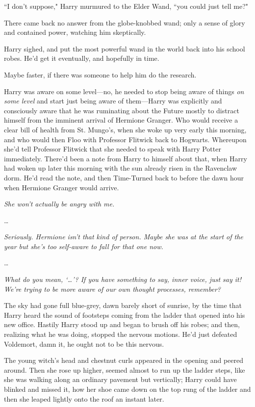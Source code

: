 ``I don't suppose," Harry murmured to the Elder Wand, ``you could just tell me?"

There came back no answer from the globe-knobbed wand; only a sense of glory and contained power, watching him skeptically.

Harry sighed, and put the most powerful wand in the world back into his school robes. He'd get it eventually, and hopefully in time.

Maybe faster, if there was someone to help him do the research.

Harry was aware on some level---no, he needed to stop being aware of things \emph{on some level} and start just being aware of them---Harry was explicitly and consciously aware that he was ruminating about the Future mostly to distract himself from the imminent arrival of Hermione Granger. Who would receive a clear bill of health from St. Mungo's, when she woke up very early this morning, and who would then Floo with Professor Flitwick back to Hogwarts. Whereupon she'd tell Professor Flitwick that she needed to speak with Harry Potter immediately. There'd been a note from Harry to himself about that, when Harry had woken up later this morning with the sun already risen in the Ravenclaw dorm. He'd read the note, and then Time-Turned back to before the dawn hour when Hermione Granger would arrive.

\emph{She won't actually be angry with me.}

{\ldots}

\emph{Seriously. Hermione isn't that kind of person. Maybe she was at the start of the year but she's too self-aware to fall for that one now.}

{\ldots}

\emph{What do you mean, `{\ldots}'? If you have something to say, inner voice, just say it! We're trying to be more aware of our own thought processes, remember?}

\later

The sky had gone full blue-grey, dawn barely short of sunrise, by the time that Harry heard the sound of footsteps coming from the ladder that opened into his new office. Hastily Harry stood up and began to brush off his robes; and then, realizing what he was doing, stopped the nervous motions. He'd just defeated Voldemort, damn it, he ought not to be this nervous.

The young witch's head and chestnut curls appeared in the opening and peered around. Then she rose up higher, seemed almost to run up the ladder steps, like she was walking along an ordinary pavement but vertically; Harry could have blinked and missed it, how her shoe came down on the top rung of the ladder and then she leaped lightly onto the roof an instant later.

